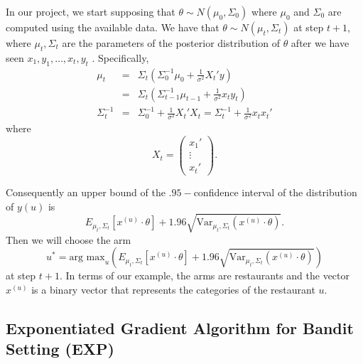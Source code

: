 \documentclass{article}
\theoremstyle{plain}
\theoremstyle{definition}
\begin{document}
In our project, we start supposing that $\theta\sim N\left(\mu_{0},\Sigma_{0}\right)$
where $\mu_{0}$ and $\Sigma_{0}$ are computed using the available
data. We have that $\theta\sim N\left(\mu_{t},\Sigma_{t}\right)$
at step $t+1$, where $\mu_{t},\Sigma_{t}$ are the parameters of
the posterior distribution of $\theta$ after we have seen $x_{1},y_{1},\ldots,x_{t},y_{t}$
. Specifically,
\begin{eqnarray*}
\mu_{t} & = & \Sigma_{t}\left(\Sigma_{0}^{-1}\mu_{0}+\frac{1}{\sigma^{2}}X_{t}'y\right)\\
 & = & \Sigma_{t}\left(\Sigma_{t-1}^{-1}\mu_{t-1}+\frac{1}{\sigma^{2}}x_{t}y_{t}\right)\\
\Sigma_{t}^{-1} & = & \Sigma_{0}^{-1}+\frac{1}{\sigma^{2}}X_{t}'X_{t}=\Sigma_{t}^{-1}+\frac{1}{\sigma^{2}}x_{t}x_{t}'
\end{eqnarray*}
where 
\[
X_{t}=\left(\begin{array}{c}
x_{1}'\\
\vdots\\
x_{t}'
\end{array}\right).
\]


Consequently an upper bound of the $.95-$confidence interval of the distribution
of $y\left(u\right)$ is 
\[
E_{\mu_{t},\Sigma_{t}}\left[x^{\left(u\right)}\cdot\theta\right]+1.96\sqrt{\mbox{Var}_{\mu_{t},\Sigma_{t}}\left(x^{\left(u\right)}\cdot\theta\right)}.
\]
Then we will choose the arm 
\[u^{*}=\mbox{arg max}_{u}\left(E_{\mu_{t},\Sigma_{t}}\left[x^{\left(u\right)}\cdot\theta\right]+1.96\sqrt{\mbox{Var}_{\mu_{t},\Sigma_{t}}\left(x^{\left(u\right)}\cdot\theta\right)}\right)\]
at step $t+1$. In terms of our example, the arms are restaurants
and the vector $x^{\left(u\right)}$ is a binary vector that represents
the categories of the restaurant $u$.

\subsection{Exponentiated Gradient Algorithm for Bandit Setting (EXP)}
\end{document}
